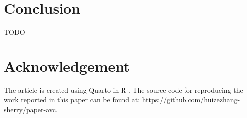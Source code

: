 \documentclass[
  12pt,
]{interact}
\begin{document}
\section{Conclusion}\label{sec-conclusion}

TODO

\section{Acknowledgement}\label{acknowledgement}

The article is created using Quarto \citep{Allaire_Quarto_2022} in R
\citep{R}. The source code for reproducing the work reported in this
paper can be found at:
\url{https://github.com/huizezhang-sherry/paper-avc}.


\renewcommand\refname{References}
  
\end{document}
